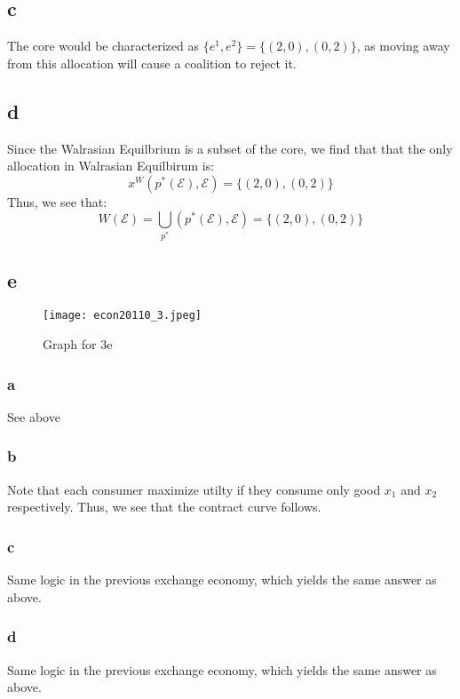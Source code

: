 \documentclass[11pt]{article}
\begin{document}
\subsection*{c}
The core would be characterized as $\{e^1, e^2\} = \{(2, 0), (0, 2) \}$, as moving away from this allocation will cause a coalition to reject it. 
\subsection*{d}
Since the Walrasian Equilbrium is a subset of the core, we find that that the only allocation in Walrasian Equilbirum is:
\[
x^W(p^*(\mathcal{E}), \mathcal{E}) = \{(2, 0), (0, 2) \}
\]
Thus, we see that: 
\[
W(\mathcal{E}) = \bigcup_{p^*}(p^*(\mathcal{E}), \mathcal{E}) = \{(2, 0), (0, 2) \}
\]
\subsection*{e}
\begin{figure}[H]
    \centering
    \texttt{[image: econ20110\_3.jpeg]}
    \caption{Graph for 3e}
    \label{fig:enter-label}
\end{figure}
\subsubsection*{a}
See above
\subsubsection*{b}
Note that each consumer maximize utilty if they consume only good $x_1$ and $x_2$ respectively. Thus, we see that the contract curve follows. 
\subsubsection*{c}
Same logic in the previous exchange economy, which yields the same answer as above. 
\subsubsection*{d}
Same logic in the previous exchange economy, which yields the same answer as above. 
\end{document}
